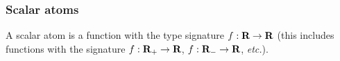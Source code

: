 \documentclass[11pt]{article}
\newcommand{\etc}{{\it etc.}}
\newcommand{\reals}{{\mbox{\bf R}}}
\begin{document}
% 
% 
  
  
\subsubsection{Scalar atoms}
A scalar atom is a function with the type signature $f : \reals \to \reals$ (this includes functions with the signature $f : \reals_+ \to \reals$, $f : \reals_- \to \reals$, \etc).
\end{document}
